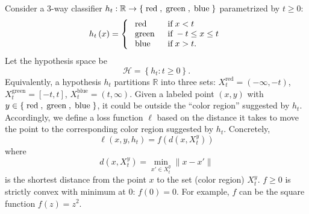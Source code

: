 \documentclass{article}
\def\H{\mathcal H}
\def\R{\mathbb R}
\begin{document}
\begin{figure}[H] \centering {} \label{fig:1dam}
\end{figure}
 Consider a 3-way classifier $h_t: \R \to  \left\{\text{\;red\;}, \text{\;green\;}, \text{\;blue\;}\right\} $ parametrized by $t\ge 0$:
 \begin{equation}
 h_{t}\left(x\right) =\left\{ \begin{array}{ll}
 \text{\;red\;}& \text{\;if\;} x < t  \\
 \text{\;green\;}& \text{\;if\;} -t \leq  x \leq  t \\
 \text{\;blue\;}& \text{\;if\;} x  > t. \\
 \end{array}\right. 
 \end{equation}
 Let the hypothesis space be
 \begin{equation}
 \H = \left\{ h_t : t \geq  0\right\}.
 \end{equation}
 Equivalently, a hypothesis $h_t$ partitions $\R$ into three sets: 
 $X^\text{red}_t = (-\infty, -t)$,
 $X^\text{green}_t = [-t, t]$,
 $X^\text{blue}_t = (t, \infty)$.
 Given a labeled point $(x,y)$ with  $y \in \left\{\text{\;red\;}, \text{\;green\;}, \text{\;blue\;}\right\}$, it could be outside the ``color region'' suggested by $h_t$. 
 Accordingly, we define a loss function $\ell$ based on the distance it takes to move the point to the corresponding color region suggested by $h_t$.
 Concretely,
 \begin{equation}
 \ell\left(x, y, h_t\right) = f(d(x, X^y_t))
 \end{equation}
 where 
 \begin{equation}
 d(x, X^y_t) = \min_{x' \in X^y_t} \|x-x'\|
 \end{equation}
 is the shortest distance from the point $x$ to the set (color region) $X^y_t$.
 $f \ge 0$ is strictly convex with minimum at 0: $f(0) = 0$.
 For example, $f$ can be the square function $f(z)=z^2$.
 
\end{document}
